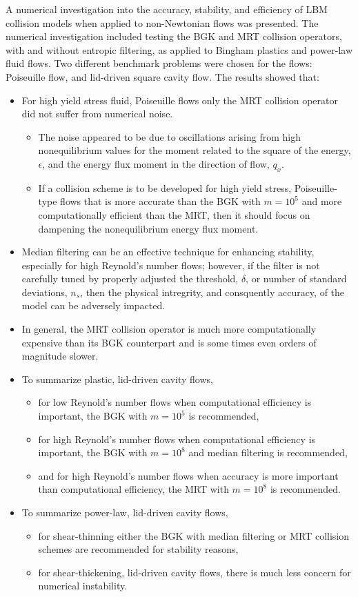 \documentclass{article}
\begin{document}
A numerical investigation into the accuracy, stability, and efficiency of LBM collision models when applied to non-Newtonian flows was presented.
The numerical investigation included testing the BGK and MRT collision operators, with and without entropic filtering, as applied to Bingham plastics and power-law fluid flows.
Two different benchmark problems were chosen for the flows: Poiseuille flow, and lid-driven square cavity flow.
The results showed that:
\begin{itemize}
  \item For high yield stress fluid, Poiseuille flows only the MRT collision operator did not suffer from numerical noise.
  \begin{itemize}
      \item The noise appeared to be due to oscillations arising from high nonequilibrium values for the moment related to the square of the energy, $\epsilon$, and the energy flux moment in the direction of flow, $q_x$.
      \item If a collision scheme is to be developed for high yield stress, Poiseuille-type flows that is more accurate than the BGK with $m = 10^5$ and more computationally efficient than the MRT, then it should focus on dampening the nonequilibrium energy flux moment.
    \end{itemize}
  \item Median filtering can be an effective technique for enhancing stability, especially for high Reynold's number flows; however, if the filter is not carefully tuned by properly adjusted the threshold, $\delta$, or number of standard deviations, $n_s$, then the physical intregrity, and consquently accuracy, of the model can be adversely impacted.
  \item In general, the MRT collision operator is much more computationally expensive than its BGK counterpart and is some times even orders of magnitude slower.
  \item To summarize plastic, lid-driven cavity flows,
    \begin{itemize}
  \item for low Reynold's number flows when computational efficiency is important, the BGK with $m = 10^5$ is recommended,
  \item for high Reynold's number flows when computational efficiency is important, the BGK with $m = 10^8$ and median filtering is recommended,
  \item and for high Reynold's number flows when accuracy is more important than computational efficiency, the MRT with $m = 10^8$ is recommended.
    \end{itemize}
  \item To summarize power-law, lid-driven cavity flows,
    \begin{itemize}
  \item for shear-thinning either the BGK with median filtering or MRT collision schemes are recommended for stability reasons,
  \item for shear-thickening, lid-driven cavity flows, there is much less concern for numerical instability.
    \end{itemize}
\end{itemize}
\end{document}
